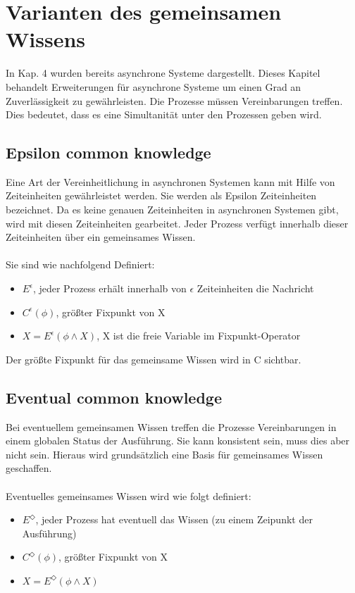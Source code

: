 \section{Varianten des gemeinsamen Wissens}
\label{GemeinsamesWissen}
In Kap. 4 wurden bereits asynchrone Systeme dargestellt. Dieses Kapitel behandelt Erweiterungen für asynchrone Systeme um einen Grad an Zuverlässigkeit zu gewährleisten. Die Prozesse müssen Vereinbarungen treffen. Dies bedeutet, dass es eine Simultanität unter den Prozessen geben wird. 
\subsection{Epsilon common knowledge}
\label{epsilon_comm_know}
Eine Art der Vereinheitlichung in asynchronen Systemen kann mit Hilfe von Zeiteinheiten gewährleistet werden. Sie werden als Epsilon Zeiteinheiten bezeichnet. Da es keine genauen Zeiteinheiten in asynchronen Systemen gibt, wird mit diesen Zeiteinheiten gearbeitet. Jeder Prozess verfügt innerhalb dieser Zeiteinheiten über ein gemeinsames Wissen.\\\\ Sie sind wie nachfolgend Definiert:
\begin{itemize}
			\item $E^\epsilon$, jeder Prozess erhält innerhalb von $\epsilon$ Zeiteinheiten die Nachricht
			\item $C^\epsilon(\phi) $, größter Fixpunkt von X
			\item $X=E^\epsilon(\phi \wedge X) $, X ist die freie Variable im Fixpunkt-Operator 
		\end{itemize}
Der größte Fixpunkt für das gemeinsame Wissen wird in C sichtbar.
\subsection{Eventual common knowledge}
\label{eventual_comm_know}
Bei eventuellem gemeinsamen Wissen treffen die Prozesse Vereinbarungen in einem globalen Status der Ausführung. Sie kann konsistent sein, muss dies aber nicht sein. Hieraus wird grundsätzlich eine Basis für gemeinsames Wissen geschaffen. \\\\
Eventuelles gemeinsames Wissen wird wie folgt definiert:
\begin{itemize}
			\item $E^\Diamond$, jeder Prozess hat eventuell das Wissen (zu einem Zeipunkt der Ausführung)
			\item $C^\Diamond(\phi) $, größter Fixpunkt von X
			\item $X=E^\Diamond(\phi \wedge X) $

\end{itemize}

